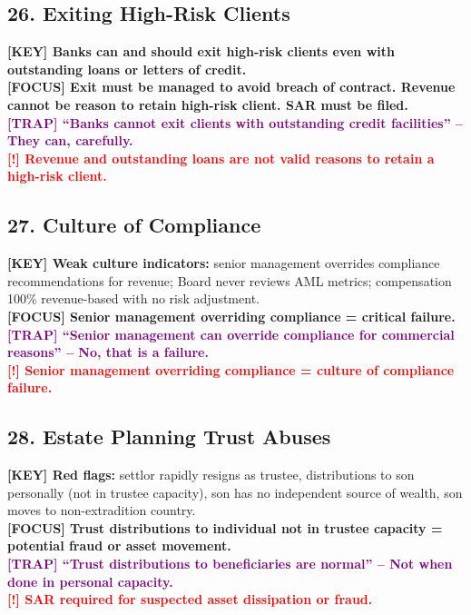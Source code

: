 \documentclass[10pt,a4paper]{article}
\newcommand{\redflag}[1]{\textcolor{red}{\textbf{[!] #1}}}
\newcommand{\examfocus}[1]{\textcolor{orange!80!black}{\textbf{[FOCUS] #1}}}
\newcommand{\trap}[1]{\textcolor{purple}{\textbf{[TRAP] #1}}}
\newcommand{\keyterm}[1]{\textcolor{red!80!black}{\textbf{[KEY] #1}}}
\begin{document}
\subsection*{26. Exiting High-Risk Clients}
\keyterm{Banks can and should exit high-risk clients even with outstanding loans or letters of credit.} \\
\examfocus{Exit must be managed to avoid breach of contract. Revenue cannot be reason to retain high-risk client. SAR must be filed.} \\
\trap{“Banks cannot exit clients with outstanding credit facilities” – They can, carefully.} \\
\redflag{Revenue and outstanding loans are not valid reasons to retain a high-risk client.}

\subsection*{27. Culture of Compliance}
\keyterm{Weak culture indicators:} senior management overrides compliance recommendations for revenue; Board never reviews AML metrics; compensation 100\% revenue-based with no risk adjustment. \\
\examfocus{Senior management overriding compliance = critical failure.} \\
\trap{“Senior management can override compliance for commercial reasons” – No, that is a failure.} \\
\redflag{Senior management overriding compliance = culture of compliance failure.}

\subsection*{28. Estate Planning Trust Abuses}
\keyterm{Red flags:} settlor rapidly resigns as trustee, distributions to son personally (not in trustee capacity), son has no independent source of wealth, son moves to non-extradition country. \\
\examfocus{Trust distributions to individual not in trustee capacity = potential fraud or asset movement.} \\
\trap{“Trust distributions to beneficiaries are normal” – Not when done in personal capacity.} \\
\redflag{SAR required for suspected asset dissipation or fraud.}
\end{document}
